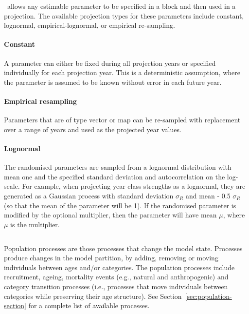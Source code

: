 \CNAME\ allows any estimable parameter to be specified in a  block and then used in a projection. The available projection types for these parameters include constant, lognormal, empirical-lognormal, or empirical re-sampling.

\paragraph*{Constant}

A parameter can either be fixed during all projection years or specified individually for each projection year. This is a deterministic assumption, where the parameter is assumed to be known without error in each future year.

\paragraph*{Empirical resampling}

Parameters that are of type vector or map can be re-sampled with replacement over a range of years and used as the projected year values.

\paragraph*{Lognormal}

The randomised parameters are sampled from a lognormal distribution with mean one and the specified standard deviation and autocorrelation on the log-scale. For example, when projecting year class strengths as a lognormal, they are generated as a Gaussian process with standard deviation $\sigma_R$ and mean - 0.5 $\sigma_R$ (so that the mean of the parameter will be 1). If the randomised parameter is modified by the optional multiplier, then the parameter will have mean $\mu$, where $\mu$ is the multiplier.

\subsection{}

Population processes are those processes that change the model state. Processes produce changes in the model partition, by adding, removing or moving individuals between ages and/or categories. The population processes include recruitment, ageing,  mortality events (e.g., natural and anthropogenic) and category transition processes (i.e., processes that move individuals between categories while preserving their age structure). See Section~\ref{sec:population-section} for a complete list of available processes.

